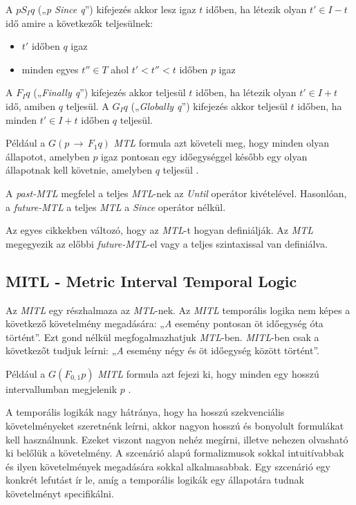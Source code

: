 A $p S_I q$ („\textit{p Since q}”) kifejezés akkor lesz igaz $t$ időben, ha létezik olyan $t' \in I - t$ idő amire a következők teljesülnek:
\begin{itemize}
    \item $t'$ időben $q$ igaz
    \item minden egyes $t'' \in T$ ahol $t' < t'' < t$ időben $p$ igaz
\end{itemize}

A $F_I q$ („\textit{Finally q}”) kifejezés akkor teljesül $t$ időben, ha létezik olyan $t' \in I + t$ idő, amiben $q$ teljesül.
A $G_I q$ („\textit{Globally q}”) kifejezés akkor teljesül $t$ időben, ha minden $t' \in I + t$ időben $q$ teljesül.

Például a $G(p \,\to\, F_{1} q)$ \textit{MTL} formula azt követeli meg, hogy minden olyan állapotot, amelyben $p$ igaz pontosan egy időegységgel később egy olyan állapotnak kell követnie, amelyben $q$ teljesül \cite{MTL1}.

A \textit{past-MTL} megfelel a teljes \textit{MTL}-nek az \textit{Until} operátor kivételével.
Hasonlóan, a \textit{future-MTL} a teljes \textit{MTL} a \textit{Since} operátor nélkül.

Az egyes cikkekben változó, hogy az \textit{MTL}-t hogyan definiálják.
Az \textit{MTL} megegyezik az előbbi \textit{future-MTL}-el vagy a teljes szintaxissal van definiálva.

\subsection{MITL - Metric Interval Temporal Logic}

Az \textit{MITL} \cite{MITL1} egy részhalmaza az \textit{MTL}-nek.
Az \textit{MITL} temporális logika nem képes a következő követelmény megadására: „\textit{A} esemény pontosan öt időegység óta történt”.
Ezt gond nélkül megfogalmazhatjuk \textit{MTL}-ben.
\textit{MITL}-ben csak a következőt tudjuk leírni: „\textit{A} esemény négy és öt időegység között történt”.

Például a $G(F_{0,1}p)$ \textit{MITL} formula azt fejezi ki, hogy minden egy hosszú intervallumban megjelenik $p$ \cite{MITL1}.

A temporális logikák nagy hátránya, hogy ha hosszú szekvenciális követelményeket szeretnénk leírni, akkor nagyon hosszú és bonyolult formulákat kell használnunk.
Ezeket viszont nagyon nehéz megírni, illetve nehezen olvasható ki belőlük a követelmény.
A szcenárió alapú formalizmusok sokkal intuitívabbak és ilyen követelmények megadására sokkal alkalmasabbak.
Egy szcenárió egy konkrét lefutást ír le, amíg a temporális logikák egy állapotára tudnak követelményt specifikálni.

